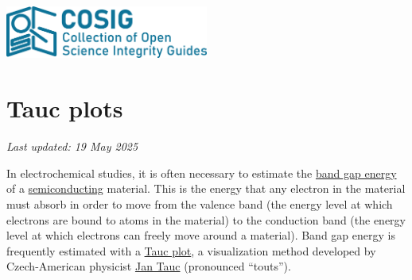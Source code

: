 \documentclass[letterpaper, 12pt]{article}
\begin{document}
\flushleft
\includegraphics[width=0.5\textwidth]{img/home/241017_final_logo_mockup.png}

\section*{Tauc plots}
\textit{Last updated: 19 May 2025}

In electrochemical studies, it is often necessary to estimate the \href{https://en.wikipedia.org/wiki/Band_gap}{band gap energy} of a \href{https://en.wikipedia.org/wiki/Semiconductor}{semiconducting} material. This is the energy that any electron in the material must absorb in order to move from the valence band (the energy level at which electrons are bound to atoms in the material) to the conduction band (the energy level at which electrons can freely move around a material). Band gap energy is frequently estimated with a \href{https://en.wikipedia.org/wiki/Tauc_plot}{Tauc plot}, a visualization method developed by Czech-American physicist \href{https://en.wikipedia.org/wiki/Jan_Tauc}{Jan Tauc} (pronounced  ``touts'').
\end{document}
